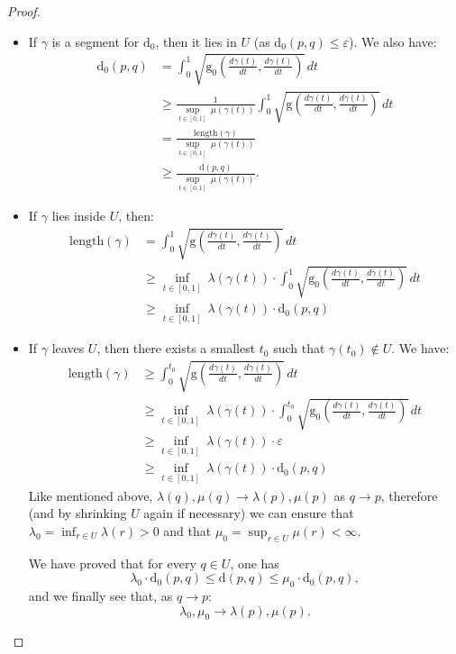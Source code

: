 \documentclass[10pt,a4paper]{amsart}
\newcommand{\dis}{\mathrm{d}}
\newcommand{\eps}{\varepsilon}
\newcommand{\g}{\mathrm{g}}
\newcommand{\length}{\mathrm{length}}
\begin{document}
\begin{proof}
\begin{itemize}
\item If $\gamma$ is a segment for $\dis_0$, then it lies in $U$ (as $\dis_0(p,q)\leq\eps$). We also have:
%
\begin{align*}
\dis_0(p,q)&=\int_0^1\sqrt{\g_0\left(\frac{d\gamma(t)}{dt},\frac{d\gamma(t)}{dt}\right)}\, dt\\
&\geq \frac{1}{\sup_{t\in[0,1]}\ \mu(\gamma(t))}\int_0^1\sqrt{\g\left(\frac{d\gamma(t)}{dt},\frac{d\gamma(t)}{dt}\right)}\, dt\\
&=\frac{\length(\gamma)}{\sup_{t\in[0,1]}\ \mu(\gamma(t))}\\
&\geq \frac{\dis(p,q)}{\sup_{t\in[0,1]}\ \mu(\gamma(t))}.
\end{align*}
%
\item If $\gamma$ lies inside $U$, then:
%
\begin{align*}
\length(\gamma)&=\int_0^1\sqrt{\g\left(\frac{d\gamma(t)}{dt},\frac{d\gamma(t)}{dt}\right)}\, dt\\
&\geq \inf_{t\in[0,1]}\ \lambda(\gamma(t)) \cdot \int_0^1\sqrt{\g_0\left(\frac{d\gamma(t)}{dt},\frac{d\gamma(t)}{dt}\right)}\, dt\\
&\geq \inf_{t\in[0,1]}\ \lambda(\gamma(t))\cdot\dis_0(p,q)
\end{align*}
%
\item If $\gamma$ leaves $U$, then there exists a smallest $t_0$ such that $\gamma(t_0)\notin U$. We have:
%
\begin{align*}
\length(\gamma)&\geq\int_0^{t_0}\sqrt{\g\left(\frac{d\gamma(t)}{dt},\frac{d\gamma(t)}{dt}\right)}\, dt\\
&\geq \inf_{t\in[0,1]}\ \lambda(\gamma(t))\cdot\int_0^{t_0}\sqrt{\g_0\left(\frac{d\gamma(t)}{dt},\frac{d\gamma(t)}{dt}\right)}\, dt\\
&\geq \inf_{t\in[0,1]}\ \lambda(\gamma(t))\cdot\eps\\
&\geq \inf_{t\in[0,1]}\ \lambda(\gamma(t))\cdot\dis_0(p,q)
\end{align*}
Like mentioned above, $\lambda(q),\mu(q)\rightarrow \lambda(p),\mu(p)$ as $q\rightarrow p$, therefore (and by shrinking $U$ again if necessary) we can ensure that $\lambda_0=\inf_{r\in U}\lambda(r)>0$ and that $\mu_0=\sup_{r\in U}\mu(r)<\infty$.

We have proved that for every $q\in U$, one has
$$\lambda_0\cdot\dis_0(p,q)\leq \dis(p,q)\leq\mu_0\cdot\dis_0(p,q),$$
and we finally see that, as $q\rightarrow p$:
$$\lambda_0,\mu_0\rightarrow \lambda(p),\mu(p).$$
\end{itemize}

\end{proof}
\end{document}
